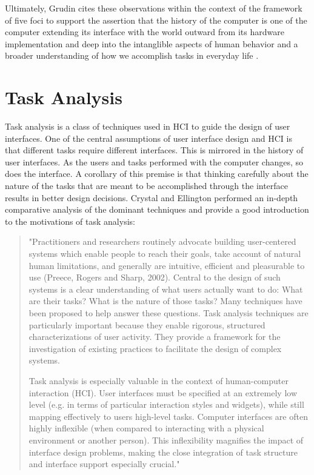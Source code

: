 Ultimately, Grudin cites these observations within the context of the framework of five foci to support the assertion that the history of the computer is one of the computer extending its interface with the world outward from its hardware implementation and deep into the intanglible aspects of human behavior and a broader understanding of how we accomplish tasks in everyday life \cite{continuity1990}.

\section{Task Analysis}

Task analysis is a class of techniques used in HCI to guide the design of user interfaces. One of the central assumptions of user interface design and HCI is that different tasks require different interfaces. This is mirrored in the history of user interfaces. As the users and tasks performed with the computer changes, so does the interface. A corollary of this premise is that thinking carefully about the nature of the tasks that are meant to be accomplished through the interface results in better design decisions. Crystal and Ellington performed an in-depth comparative analysis of the dominant techniques and provide a good introduction to the motivations of task analysis:

\begin{quote}
"Practitioners and researchers routinely advocate building user-centered systems which enable people to reach their goals, take account of natural human limitations, and generally are intuitive, efficient and pleasurable to use (Preece, Rogers and Sharp, 2002). Central to the design of such systems is a clear understanding of what users actually want to do: What are their tasks? What is the nature of those tasks? Many techniques have been proposed to help answer these questions. Task analysis techniques are particularly important because they enable rigorous, structured characterizations of user activity. They provide a framework for the investigation of existing practices to facilitate the design of complex systems.

Task analysis is especially valuable in the context of human-computer interaction (HCI). User interfaces must be specified at an extremely low level (e.g. in terms of particular interaction styles and widgets), while still mapping effectively to users high-level tasks. Computer interfaces are often highly inflexible (when compared to interacting with a physical environment or another person). This inflexibility magnifies the impact of interface design problems, making the close integration of task structure and interface support especially crucial." \cite{crystal2004}
\end{quote}


